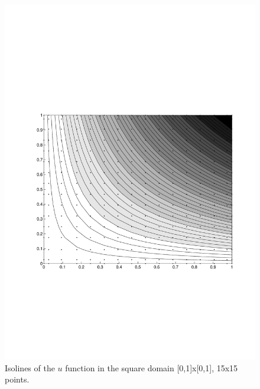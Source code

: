 \begin{multicols}{2}
\begin{figure}[H]
\centering
\includegraphics[scale=0.45, trim = 30mm 75mm 15mm 80mm, clip]{./Figures/3-BVP/results_15.pdf}
\caption{Isolines of the $u$ function in the square domain [0,1]x[0,1], 15x15
points. }
\end{figure}

\end{multicols}

